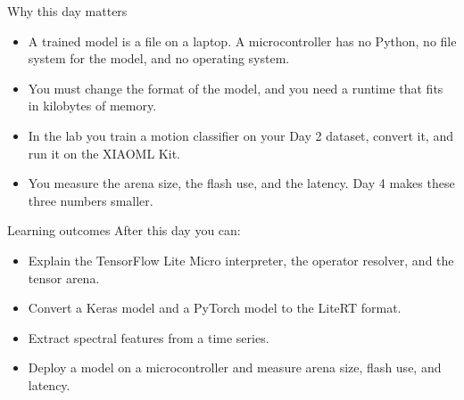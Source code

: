 \begin{frame}{Why this day matters}
  \begin{itemize}
    \item A trained model is a file on a laptop. A microcontroller has no
          Python, no file system for the model, and no operating system.
    \item You must change the format of the model, and you need a runtime that
          fits in kilobytes of memory.
    \item In the lab you train a motion classifier on your Day 2 dataset,
          convert it, and run it on the XIAOML Kit.
    \item You measure the arena size, the flash use, and the latency. Day 4
          makes these three numbers smaller.
  \end{itemize}
\end{frame}

\begin{frame}{Learning outcomes}
  After this day you can:
  \begin{itemize}
    \item Explain the TensorFlow Lite Micro interpreter, the operator
          resolver, and the tensor arena.
    \item Convert a Keras model and a PyTorch model to the LiteRT format.
    \item Extract spectral features from a time series.
    \item Deploy a model on a microcontroller and measure arena size, flash
          use, and latency.
  \end{itemize}
\end{frame}
